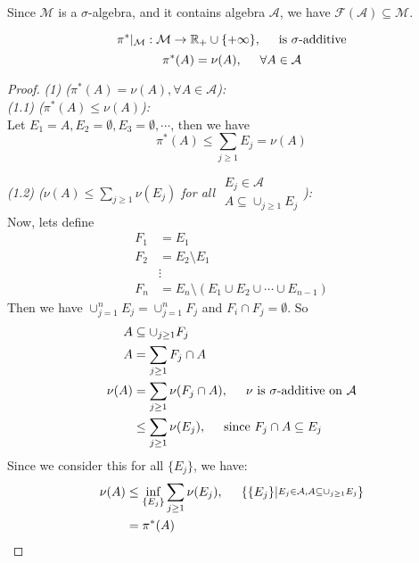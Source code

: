 \begin{remark}
Since $\mathcal{M}$ is a $\sigma$-algebra, and it contains algebra $\mathcal{A}$,
we have $\mathcal{F}(\mathcal{A}) \subseteq \mathcal{M}$.
\end{remark}

\begin{lemma}
  \[\pi^*|_{\mathcal{M}} : \mathcal{M} \to \mathbb{R}_+\cup\{+\infty\}, \hspace{0.5cm} \mbox{is $\sigma$-additive}\]
  \[\pi^*(A) = \nu(A), \hspace{0.5cm} \forall A\in\mathcal{A}\]
\end{lemma}
\begin{proof}
  \emph{(1) ($\pi^*(A) = \nu(A), \forall A\in\mathcal{A}$):} \\
  \emph{(1.1) ($\pi^*(A) \leq \nu(A)$):} \\
  Let $E_1 = A, E_2 = \emptyset, E_3 = \emptyset, \cdots$, then we have
  \[\pi^*(A) \leq \sum_{j\geq 1} E_j = \nu(A)\]

  \emph{(1.2) ($\nu(A) \leq \sum_{j\geq 1} \nu(E_j)$ for all $\substack{E_j\in\mathcal{A}\\A\subseteq\cup_{j\geq 1} E_j}$):} \\
  Now, lets define
  \begin{align*}
    F_1 &= E_1 \\
    F_2 &= E_2\setminus E_1 \\
        &\vdots\\
    F_n &= E_n\setminus(E_1\cup E_2 \cup \cdots \cup E_{n-1})
  \end{align*}
  Then we have $\cup_{j=1}^n E_j = \cup_{j=1}^n F_j$ and $F_i\cap F_j = \emptyset$.
  So
  \begin{align*}
    A &\subseteq \cup_{j\geq 1} F_j \\
    A &= \sum_{j\geq 1} F_j\cap A \\
    \nu(A) &= \sum_{j\geq 1} \nu(F_j\cap A), \hspace{0.5cm} \mbox{$\nu$ is $\sigma$-additive on $\mathcal{A}$} \\
           &\leq \sum_{j\geq 1} \nu(E_j), \hspace{0.5cm} \mbox{since $F_j\cap A\subseteq E_j$}
  \end{align*}
  Since we consider this for all $\{E_j\}$, we have:
  \begin{align*}
    \nu(A) &\leq \inf_{\{E_j\}} \sum_{j\geq 1} \nu(E_j), \hspace{0.5cm} \{\{E_j\} | \substack{E_j\in\mathcal{A}, A\subseteq \cup_{j\geq 1} E_j}\} \\
             &= \pi^*(A) 
  \end{align*}


\end{proof}
